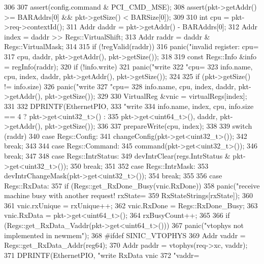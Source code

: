 \begin{DoxyCode}
306 {
307     assert(config.command & PCI_CMD_MSE);
308     assert(pkt->getAddr() >= BARAddrs[0] && pkt->getSize() < BARSize[0]);
309 
310     int cpu = pkt->req->contextId();
311     Addr daddr = pkt->getAddr() - BARAddrs[0];
312     Addr index = daddr >> Regs::VirtualShift;
313     Addr raddr = daddr & Regs::VirtualMask;
314 
315     if (!regValid(raddr))
316         panic("invalid register: cpu=%
317                 cpu, daddr, pkt->getAddr(), pkt->getSize());
318 
319     const Regs::Info &info = regInfo(raddr);
320     if (!info.write)
321         panic("write %
322               "cpu=%
323               info.name, cpu, index, daddr, pkt->getAddr(), pkt->getSize());
324 
325     if (pkt->getSize() != info.size)
326         panic("write %
327               "cpu=%
328               info.name, cpu, index, daddr, pkt->getAddr(), pkt->getSize());
329 
330     VirtualReg &vnic = virtualRegs[index];
331 
332     DPRINTF(EthernetPIO,
333             "write %
334             info.name, index, cpu, info.size == 4 ? pkt->get<uint32_t>() :
335             pkt->get<uint64_t>(), daddr, pkt->getAddr(), pkt->getSize());
336 
337     prepareWrite(cpu, index);
338 
339     switch (raddr) {
340       case Regs::Config:
341         changeConfig(pkt->get<uint32_t>());
342         break;
343 
344       case Regs::Command:
345         command(pkt->get<uint32_t>());
346         break;
347 
348       case Regs::IntrStatus:
349         devIntrClear(regs.IntrStatus & pkt->get<uint32_t>());
350         break;
351 
352       case Regs::IntrMask:
353         devIntrChangeMask(pkt->get<uint32_t>());
354         break;
355 
356       case Regs::RxData:
357         if (Regs::get_RxDone_Busy(vnic.RxDone))
358             panic("receive machine busy with another request! rxState=%
359                   RxStateStrings[rxState]);
360 
361         vnic.rxUnique = rxUnique++;
362         vnic.RxDone = Regs::RxDone_Busy;
363         vnic.RxData = pkt->get<uint64_t>();
364         rxBusyCount++;
365 
366         if (Regs::get_RxData_Vaddr(pkt->get<uint64_t>())) {
367             panic("vtophys not implemented in newmem");
368 #ifdef SINIC_VTOPHYS
369             Addr vaddr = Regs::get_RxData_Addr(reg64);
370             Addr paddr = vtophys(req->xc, vaddr);
371             DPRINTF(EthernetPIO, "write RxData vnic %
372                     "vaddr=%
}}}
\end{DoxyCode}
